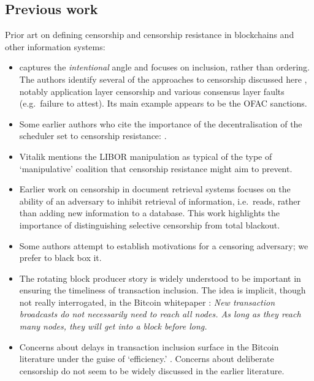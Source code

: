 \subsection{Previous work}
Prior art on defining censorship and censorship resistance in blockchains and other information systems:
\begin{itemize}
  \item 
    \cite{wahrstatter2024blockchain} captures the \emph{intentional} angle and focuses on inclusion, rather than ordering.
    The authors identify several of the approaches to censorship discussed here \cite[\S4.3]{wahrstatter2024blockchain}, notably application layer censorship and various consensus layer faults (e.g.~failure to attest).
    Its main example appears to be the OFAC sanctions.

  \item
    Some earlier authors who cite the importance of the decentralisation of the scheduler set to censorship resistance: \cite{gencer2018decentralization,silva2020impact}.

  \item
    Vitalik \cite{buterin2015problem} mentions the LIBOR manipulation as typical of the type of `manipulative' coalition that censorship resistance might aim to prevent.

  \item
    Earlier work on censorship in document retrieval systems \cite{perng2005censorship} focuses on the ability of an adversary to inhibit retrieval of information, i.e.~reads, rather than adding new information to a database.
    This work highlights the importance of distinguishing selective censorship from total blackout.
  
  \item
    Some authors \cite{danezis2004economics,FPR} attempt to establish motivations for a censoring adversary; we prefer to black box it.

  \item The rotating block producer story is widely understood to be important in ensuring the timeliness of transaction inclusion. The idea is implicit, though not really interrogated, in the Bitcoin whitepaper \cite[\S5]{nakamoto2008bitcoin}: \emph{New transaction broadcasts do not necessarily need to reach all nodes. As long as they reach many nodes, they will get into a block before long.}

  \item Concerns about delays in transaction inclusion surface in the Bitcoin literature under the guise of `efficiency.' \cite{pappalardo2018blockchain}. Concerns about deliberate censorship do not seem to be widely discussed in the earlier literature.
\end{itemize}



